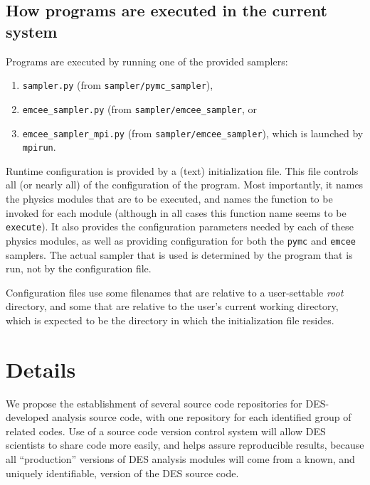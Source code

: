 \documentclass[draftmode,draftwater]{memarticle}
\newcommand{\prog}[1]%
  {\texttt{#1}}
\begin{document}
\section{How programs are executed in the current system}

Programs are executed by running one of the provided samplers:
\begin{enumerate}
\item \prog{sampler.py} (from \prog{sampler/pymc\_sampler}),
\item \prog{emcee\_sampler.py} (from \prog{sampler/emcee\_sampler}, or
\item \prog{emcee\_sampler\_mpi.py} (from
  \prog{sampler/emcee\_sampler}), which is launched by \prog{mpirun}.
\end{enumerate}

Runtime configuration is provided by a (text) initialization file. This
file controls all (or nearly all) of the configuration of the program.
Most importantly, it names the physics modules that are to be executed,
and names the function to be invoked for each module (although in all
cases this function name seems to be \texttt{execute}). It also provides
the configuration parameters needed by each of these physics modules, as
well as providing configuration for both the \texttt{pymc} and
\texttt{emcee} samplers. The actual sampler that is used is determined
by the program that is run, not by the configuration file.

Configuration files use some filenames that are relative to a
user-settable \emph{root} directory, and some that are relative to the
user's current working directory, which is expected to be the directory
in which the initialization file resides.

\chapter{Details}

We propose the establishment of several source code repositories for
DES-developed analysis source code, with one repository for each
identified group of related codes. Use of a source code version control
system will allow DES scientists to share code more easily, and helps
assure reproducible results, because all ``production'' versions of DES
analysis modules will come from a known, and uniquely identifiable,
version of the DES source code.
\end{document}
